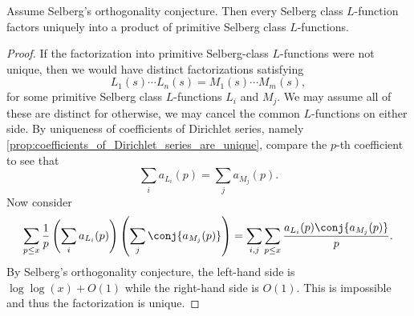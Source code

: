 \documentclass[12pt]{article}
\begin{document}
      \begin{proposition}
        Assume Selberg's orthogonality conjecture. Then every Selberg class \(L\)-function factors uniquely into a product of primitive Selberg class \(L\)-functions.
      \end{proposition}
      \begin{proof}
        If the factorization into primitive Selberg-class \(L\)-functions were not unique, then we would have distinct factorizations satisfying
        \[
          L_{1}(s) \cdots L_{n}(s) = M_{1}(s) \cdots M_{m}(s),
        \]
        for some primitive Selberg class \(L\)-functions \(L_{i}\) and \(M_{j}\). We may assume all of these are distinct for otherwise, we may cancel the common \(L\)-functions on either side. By uniqueness of coefficients of Dirichlet series, namely \cref{prop:coefficients_of_Dirichlet_series_are_unique}, compare the \(p\)-th coefficient to see that
        \[
          \sum_{i}a_{L_{i}}(p) = \sum_{j}a_{M_{j}}(p).
        \]
        Now consider
        \[
          \sum_{p \le x}\frac{1}{p}\left(\sum_{i}a_{L_{i}}(p)\right)\left(\sum_{j}\conj{a_{M_{j}}(p)}\right) = \sum_{i,j}\sum_{p \le x}\frac{a_{L_{i}}(p)\conj{a_{M_{j}}(p)}}{p}.
        \]
        By Selberg's orthogonality conjecture, the left-hand side is \(\log\log(x)+O(1)\) while the right-hand side is \(O(1)\). This is impossible and thus the factorization is unique.
      \end{proof}
\end{document}
